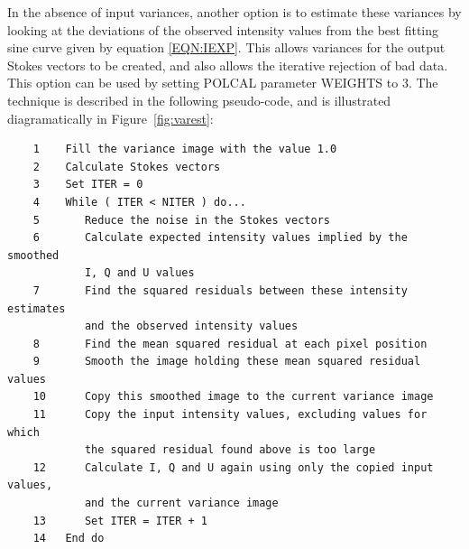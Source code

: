 \documentclass[twoside,11pt]{article}
\newcommand{\latex}[1]{#1}
\newcommand{\html}[1]{}
\renewcommand{\_}{\texttt{\symbol{95}}}
\begin{document}
In the absence of input variances, another option is to estimate these
variances by looking at the deviations of the observed intensity values
from the best fitting sine curve given by equation \ref{EQN:IEXP}. This
allows variances for the output Stokes vectors to be created, and also
allows the iterative rejection of bad data. This option can be used by
setting POLCAL parameter WEIGHTS to 3. The technique is described in the
following pseudo-code, and is illustrated diagramatically in 
\latex{Figure~\ref{fig:varest}:} \html{the next figure:}

\begin{verbatim}
    1    Fill the variance image with the value 1.0
    2    Calculate Stokes vectors
    3    Set ITER = 0
    4    While ( ITER < NITER ) do...
    5       Reduce the noise in the Stokes vectors
    6       Calculate expected intensity values implied by the smoothed 
            I, Q and U values
    7       Find the squared residuals between these intensity estimates
            and the observed intensity values
    8       Find the mean squared residual at each pixel position
    9       Smooth the image holding these mean squared residual values
    10      Copy this smoothed image to the current variance image
    11      Copy the input intensity values, excluding values for which 
            the squared residual found above is too large
    12      Calculate I, Q and U again using only the copied input values, 
            and the current variance image
    13      Set ITER = ITER + 1
    14   End do
\end{verbatim}
\end{document}
